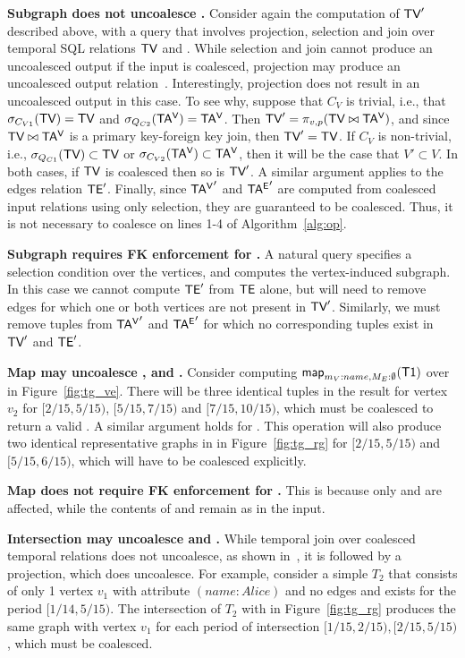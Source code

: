 {\bf Subgraph does not uncoalesce \tve.}  Consider again the
computation of $\textsf{TV}'$ described above, with a query that involves
projection, selection and join over temporal SQL relations $\textsf{TV}$ and
\tav.  While selection and join cannot produce an uncoalesced output
if the input is coalesced, projection may produce an uncoalesced
output relation~\cite{DBLP:conf/vldb/BohlenSS96}.  Interestingly,
projection does not result in an uncoalesced output in this case. To
see why, suppose that $C_V$ is trivial, i.e., that $\sigma_{C_{V1}}
(\textsf{TV}) = \textsf{TV}$ and $\sigma_{Q_{C2}} (\mathsf{TA^{V}}) = \mathsf{TA^{V}}$. Then $\textsf{TV}' =
\pi_{v,p} (\textsf{TV} \bowtie \mathsf{TA^{V}})$, and since $\textsf{TV} \bowtie \mathsf{TA^{V}}$ is a
primary key-foreign key join, then $\textsf{TV}' = \textsf{TV}$.  If $C_V$ is
non-trivial, i.e., $\sigma_{Q_{C1}} (\textsf{TV}) \subset \textsf{TV}$ or
$\sigma_{C_{V2}} (\mathsf{TA^{V}}) \subset \mathsf{TA^{V}}$, then it will be the case that
$V' \subset V$.  In both cases, if $\textsf{TV}$ is coalesced then so is
$\textsf{TV}'$.  A similar argument applies to the edges relation $\textsf{TE}'$.
Finally, since $\mathsf{TA^{V}}'$ and $\mathsf{TA^{E}}'$ are computed from coalesced input
relations using only selection, they are guaranteed to be coalesced.
Thus, it is not necessary to coalesce on lines 1-4 of
Algorithm~\ref{alg:op}.

{\bf Subgraph requires FK enforcement for \tve.}  A natural query
specifies a selection condition over the vertices, and computes the
vertex-induced subgraph.  In this case we cannot compute $\textsf{TE}'$ from
$\textsf{TE}$ alone, but will need to remove edges for which one or both
vertices are not present in $\textsf{TV}'$.  Similarly, we must remove tuples
from $\mathsf{TA^{V}}'$ and $\mathsf{TA^{E}}'$ for which no corresponding tuples exist in
$\textsf{TV}'$ and $\textsf{TE}'$.

{\bf Map may uncoalesce \tav, \tae and \trg.}  Consider computing
$\textsf{map}_{m_V:name, M_E:\emptyset} (\textsf{T1})$ over  in
Figure~\ref{fig:tg_ve}.  There will be three identical tuples in the
result for vertex $v_2$ for $[2/15, 5/15)$, $[5/15, 7/15)$ and $[7/15,
      10/15)$, which must be coalesced to return a valid \tav.  A
      similar argument holds for \tae. This operation will also
      produce two identical representative graphs in \trg in
      Figure~\ref{fig:tg_rg} for $[2/15, 5/15)$ and $[5/15, 6/15)$,
          which will have to be coalesced explicitly.

{\bf Map does not require FK enforcement for \tve.}  This is because
only \tav and \tae are affected, while the contents of \tv and \te
remain as in the input.

{\bf Intersection may uncoalesce \tve and \trg.}  While temporal join over
coalesced temporal relations does not uncoalesce, as shown
in~\cite{DBLP:conf/vldb/BohlenSS96}, it is followed by a projection,
which does uncoalesce.  For example, consider a simple \tg $T_2$
that consists of only 1 vertex $v_1$ with attribute $(name:Alice)$ and
no edges and exists for the period $[1/14, 5/15)$.  The
  intersection of $T_2$ with  in Figure~\ref{fig:tg_rg}
  produces the same graph with vertex $v_1$ for each period of
  intersection $[1/15, 2/15), [2/15, 5/15)$, which must be coalesced.

